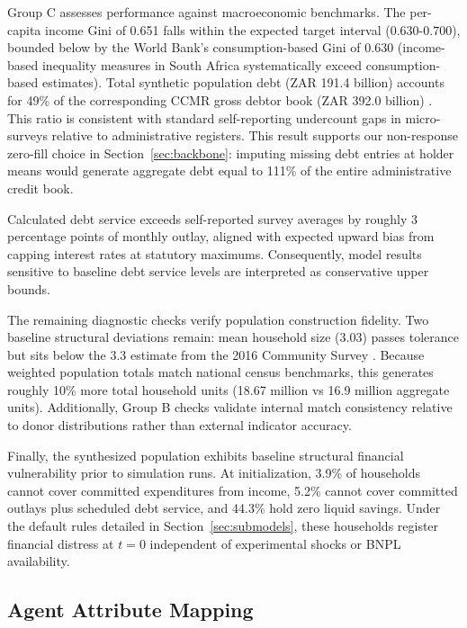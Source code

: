 Group C assesses performance against macroeconomic benchmarks.
The per-capita income Gini of 0.651 falls within the expected target interval (0.630-0.700), bounded below by the World Bank's consumption-based Gini of 0.630 \cite{worldbank_gini_zaf} (income-based inequality measures in South Africa systematically exceed consumption-based estimates).
Total synthetic population debt (ZAR 191.4 billion) accounts for 49\% of the corresponding \ac{CCMR} gross debtor book (ZAR 392.0 billion) \cite{ncr_ccmr_2017}.
This ratio is consistent with standard self-reporting undercount gaps in micro-surveys relative to administrative registers.
This result supports our non-response zero-fill choice in Section~\ref{sec:backbone}: imputing missing debt entries at holder means would generate aggregate debt equal to 111\% of the entire administrative credit book.

Calculated debt service exceeds self-reported survey averages by roughly 3 percentage points of monthly outlay, aligned with expected upward bias from capping interest rates at statutory maximums.
Consequently, model results sensitive to baseline debt service levels are interpreted as conservative upper bounds.

The remaining diagnostic checks verify population construction fidelity. Two baseline structural deviations remain: mean household size (3.03) passes tolerance but sits below the 3.3 estimate from the 2016 Community Survey \cite{statssa_cs_2016}.
Because weighted population totals match national census benchmarks, this generates roughly 10\% more total household units (18.67 million vs 16.9 million aggregate units).
Additionally, Group B checks validate internal match consistency relative to donor distributions rather than external indicator accuracy.

Finally, the synthesized population exhibits baseline structural financial vulnerability prior to simulation runs.
At initialization, 3.9\% of households cannot cover committed expenditures from income, 5.2\% cannot cover committed outlays plus scheduled debt service, and 44.3\% hold zero liquid savings.
Under the default rules detailed in Section~\ref{sec:submodels}, these households register financial distress at $t=0$ independent of experimental shocks or \ac{BNPL} availability.

\subsection{Agent Attribute Mapping}
\label{sec:agent-mapping}

